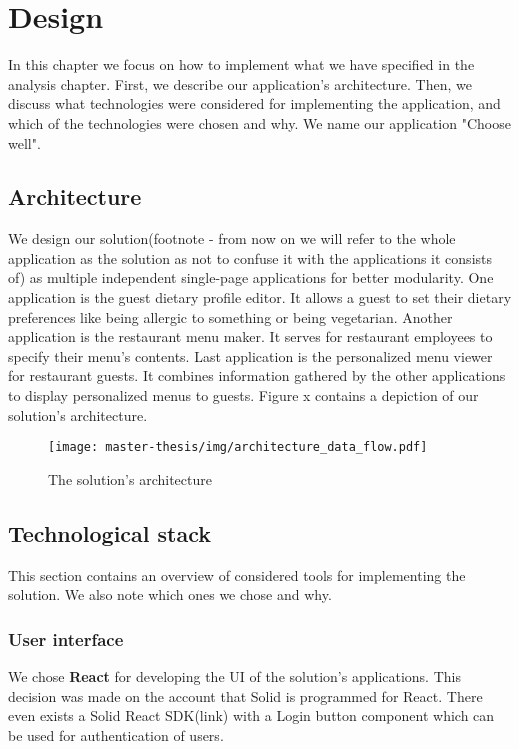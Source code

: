 \chapter{Design}
In this chapter we focus on how to implement what we have specified in the analysis chapter.
First, we describe our application's architecture.
Then, we discuss what technologies were considered for implementing the application, and which of the technologies were chosen and why.
We name our application "Choose well".

\section{Architecture}
We design our solution(footnote - from now on we will refer to the whole application as the solution as not to  confuse it with the applications it consists of) as multiple independent single-page applications for better modularity. 
One application is the guest dietary profile editor.
It allows a guest to set their dietary preferences like being allergic to something or being vegetarian.
Another application is the restaurant menu maker.
It serves for restaurant employees to specify their menu's contents.
Last application is the personalized menu viewer for restaurant guests.
It combines information gathered by the other applications to display personalized menus to guests. 
Figure x contains a depiction of our solution's architecture.

\begin{figure}[h]
  \centering
  \texttt{[image: master-thesis/img/architecture\_data\_flow.pdf]}
  \caption{The solution's architecture}
\end{figure}

\section{Technological stack}
This section contains an overview of considered tools for implementing the solution.
We also note which ones we chose and why.

\subsection*{User interface}
We chose \textbf{React} for developing the UI of the solution's applications.
This decision was made on the account that Solid is programmed for React.
There even exists a Solid React SDK(link) with a Login button component which can be used for authentication of users.

